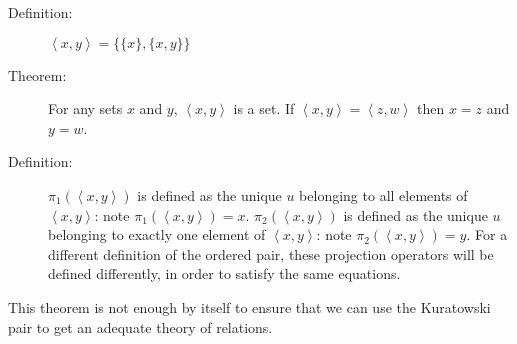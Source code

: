 \documentclass[12pt]{book}
\begin{document}
\begin{description}

\item[Definition:]  $\left<x,y\right> = \{\{x\},\{x,y\}\}$

\item[Theorem:]  For any sets $x$ and $y$, $\left<x,y\right>$ is a set.  If $\left<x,y\right>=\left<z,w\right>$ then $x=z$ and $y=w$.

\item[Definition:]  $\pi_1(\left<x,y\right>)$ is defined as the unique $u$ belonging to all elements of $\left<x,y\right>$:  note $\pi_1(\left<x,y\right>)=x$.  $\pi_2(\left<x,y\right>)$ is defined as the unique $u$ belonging to exactly one element of $\left<x,y\right>$:  note $\pi_2(\left<x,y\right>)=y$.  For a different definition of the ordered pair, these projection operators will be defined differently, in order to satisfy the same equations.

\end{description}

This theorem is not enough by itself to ensure that we can use the
Kuratowski pair to get an adequate theory of relations.
\end{document}
